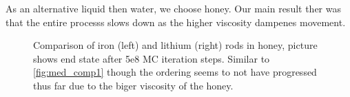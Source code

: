 As an alternative liquid then water, we choose honey. Our main result ther was that the entire processs slows down as the higher viscosity dampenes movement.
\begin{figure}
  \begin{minipage}[t]{0.45\textwidth}
  \end{minipage}
  \hfill
  \begin{minipage}[t]{0.45\textwidth}
  \end{minipage}
  \caption{Comparison of iron (left) and lithium (right) rods in honey, picture shows end state after 5e8 MC iteration steps. Similar to \ref{fig:med_comp1} though the ordering seems to not have progressed thus far due to the biger viscosity of the honey.}
  \label{fig:med_comp3}
\end{figure}
